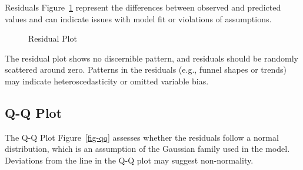 \documentclass[
  letterpaper,
  DIV=11,
  numbers=noendperiod]{scrartcl}
\begin{document}
Residuals Figure~\ref{fig-residual-plot} represent the differences
between observed and predicted values and can indicate issues with model
fit or violations of assumptions.

\begin{figure}


\caption{\label{fig-residual-plot}Residual Plot}

\end{figure}%

The residual plot shows no discernible pattern, and residuals should be
randomly scattered around zero. Patterns in the residuals (e.g., funnel
shapes or trends) may indicate heteroscedasticity or omitted variable
bias.

\subsection{Q-Q Plot}\label{q-q-plot}

The Q-Q Plot Figure~\ref{fig-qq} assesses whether the residuals follow a
normal distribution, which is an assumption of the Gaussian family used
in the model. Deviations from the line in the Q-Q plot may suggest
non-normality.
\end{document}
